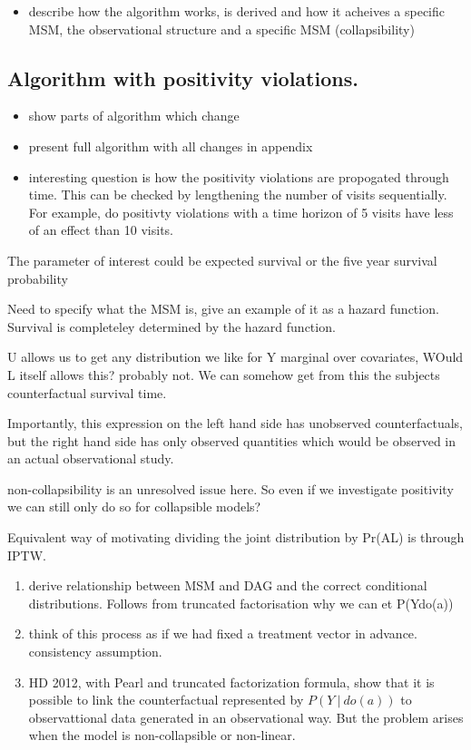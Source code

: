\documentclass[11pt]{article}
\providecommand{\tightlist}{%
      \setlength{\itemsep}{0pt}\setlength{\parskip}{0pt}}
\begin{document}
\begin{itemize}
\tightlist
\item
  describe how the algorithm works, is derived and how it acheives a
  specific MSM, the observational structure and a specific MSM
  (collapsibility)
\end{itemize}

    \subsection{Algorithm with positivity
violations.}\label{algorithm-with-positivity-violations.}

\begin{itemize}
\tightlist
\item
  show parts of algorithm which change
\item
  present full algorithm with all changes in appendix
\item
  interesting question is how the positivity violations are propogated
  through time. This can be checked by lengthening the number of visits
  sequentially. For example, do positivty violations with a time horizon
  of 5 visits have less of an effect than 10 visits.
\end{itemize}

The parameter of interest could be expected survival or the five year
survival probability

Need to specify what the MSM is, give an example of it as a hazard
function. Survival is completeley determined by the hazard function.

U allows us to get any distribution we like for Y marginal over
covariates, WOuld L itself allows this? probably not. We can somehow get
from this the subjects counterfactual survival time.

Importantly, this expression on the left hand side has unobserved
counterfactuals, but the right hand side has only observed quantities
which would be observed in an actual observational study.

non-collapsibility is an unresolved issue here. So even if we
investigate positivity we can still only do so for collapsible models?

Equivalent way of motivating dividing the joint distribution by
Pr(A\textbar{}L) is through IPTW.

\begin{enumerate}
\def\labelenumi{\arabic{enumi}.}
\item
  derive relationship between MSM and DAG and the correct conditional
  distributions. Follows from truncated factorisation why we can et
  P(Y\textbar{}do(a))
\item
  think of this process as if we had fixed a treatment vector in
  advance. consistency assumption.
\item
  HD 2012, with Pearl and truncated factorization formula, show that it
  is possible to link the counterfactual represented by
  \(P(Y\ |\ do(a))\) to observattional data generated in an
  observational way. But the problem arises when the model is
  non-collapsible or non-linear.
\end{enumerate}
\end{document}
